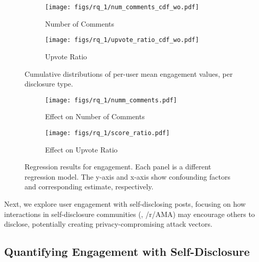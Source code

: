 \begin{figure}[t]
    \centering
    \begin{subfigure}{.38\textwidth}
        \centering
        \texttt{[image: figs/rq\_1/num\_comments\_cdf\_wo.pdf]}
        \caption{Number of Comments}
        \label{fig:comments}
    \end{subfigure}
    \quad

    \begin{subfigure}{.38\textwidth}
        \centering
        \texttt{[image: figs/rq\_1/upvote\_ratio\_cdf\_wo.pdf]}
        \caption{Upvote Ratio}
        \label{fig:upvote}
    \end{subfigure}
    \caption{Cumulative distributions of per-user mean engagement values, per disclosure type. 
    }
    \label{fig:all_engagement_cdf}
\end{figure}



\begin{figure}[t]
    \centering
    \begin{subfigure}{.5\textwidth}
        \centering
        \texttt{[image: figs/rq\_1/numm\_comments.pdf]}
        \caption{Effect on Number of Comments}
        \label{fig:engagement_num_comments}
    \end{subfigure}
    \quad
    \begin{subfigure}{.48\textwidth}
        \centering
        \texttt{[image: figs/rq\_1/score\_ratio.pdf]}
        \caption{Effect on Upvote Ratio}
        \label{fig:engagement_upvotes_ratio}
    \end{subfigure}
    \caption{Regression results for engagement. Each panel is a different regression model. The y-axis and x-axis show confounding factors and corresponding estimate, respectively.%
    }
    \label{fig:all_engagement_regression}
\end{figure}


Next, we explore user engagement with self-disclosing posts, focusing on how interactions in self-disclosure communities (\eg, /r/AMA) may encourage others to disclose, potentially creating privacy-compromising attack vectors. 




\subsection{Quantifying Engagement with Self-Disclosure} \label{subsec:engagement_diff}

